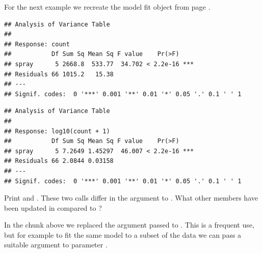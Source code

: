 \documentclass[krantz2]{krantz}\usepackage{knitr}
\begin{document}
For the next example we recreate the model fit object  from page \pageref{chunk:stat:fm4}.

\begin{knitrout}\footnotesize
{}\color{fgcolor}\begin{kframe}
\begin{alltt}
 \hlkwb{<-}  \hlopt{~}   
\end{alltt}
\begin{verbatim}
## Analysis of Variance Table
## 
## Response: count
##           Df Sum Sq Mean Sq F value    Pr(>F)    
## spray      5 2668.8  533.77  34.702 < 2.2e-16 ***
## Residuals 66 1015.2   15.38                      
## ---
## Signif. codes:  0 '***' 0.001 '**' 0.01 '*' 0.05 '.' 0.1 ' ' 1
\end{verbatim}
\begin{alltt}
 \hlkwb{<-}   \hlstd{=}  \hlopt{+} \hlstd{)} \hlopt{~} 
\end{alltt}
\begin{verbatim}
## Analysis of Variance Table
## 
## Response: log10(count + 1)
##           Df Sum Sq Mean Sq F value    Pr(>F)    
## spray      5 7.2649 1.45297  46.007 < 2.2e-16 ***
## Residuals 66 2.0844 0.03158                      
## ---
## Signif. codes:  0 '***' 0.001 '**' 0.01 '*' 0.05 '.' 0.1 ' ' 1
\end{verbatim}
\end{kframe}
\end{knitrout}

\begin{playground}
Print  and . These two calls differ in the argument to . What other members have been updated in  compared to ?
\end{playground}

In the chunk above we replaced the argument passed to . This is a frequent use, but for example to fit the same model to a subset of the data we can pass a suitable argument to parameter .
\end{document}
